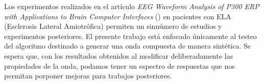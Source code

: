 \documentclass[../00_Main.tex]{subfiles}
\begin{document}
Los experimentos realizados en el artículo \textit{EEG Waveform Analysis of P300 ERP with Applications to Brain Computer Interfaces} (\cite{EEGAnalysisBCI}) en pacientes con ELA (Esclerosis Lateral Amiotrófica) permiten un sinnúmero de estudios y experimentos posteriores. El presente trabajo está enfocado únicamente al testeo del algoritmo destinado a generar una onda compuesta de manera sintética. Se espera que, con los resultados obtenidos al modificar deliberadamente las propiedades de la onda, podamos tener un espectro de respuestas que nos permitan porponer mejoras para trabajos posteriores.  

\biblio %
\end{document}
